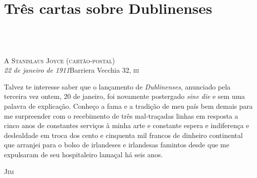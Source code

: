 


\part{Três cartas sobre Dublinenses}


\chapter*{\ }

\pagestyle{plain}


{\raggedright\large
\textsc{A Stanislaus Joyce (cartão-postal)}\\\smallskip\normalsize
\textit{22 de janeiro de 1911}\hfill Barriera Vecchia 32, \textsc{iii}
\par}

\bigskip

Talvez te interesse saber que o lançamento de \textit{Dublinenses}, anunciado
pela terceira vez ontem, 20 de janeiro, foi novamente postergado \textit{sine
die} e sem uma palavra de explicação. Conheço a fama e a tradição de meu país
bem demais para me surpreender com o recebimento de três mal-traçadas linhas em
resposta a cinco anos de constantes serviços à minha arte e constante espera e
indiferença e deslealdade em troca dos cento e cinquenta mil francos de dinheiro
continental que arranjei para o bolso de irlandeses e irlandesas famintos desde
que me expulsaram de seu hospitaleiro lamaçal há seis anos.

\medskip

{\raggedleft\scshape
Jim
\par}


\clearpage

\openany


\chapter*{\ }

